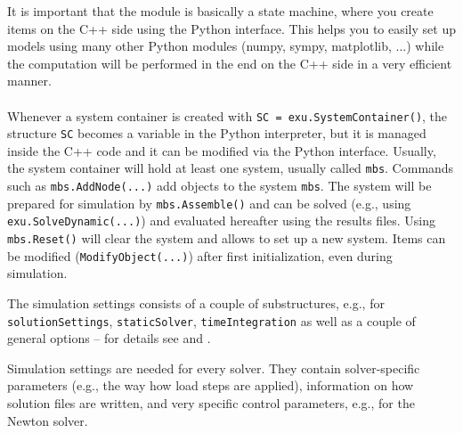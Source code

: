 It is important that the \codeName module is basically a state machine, where you create items on the C++ side using the Python interface. This helps you to easily set up models using many other Python modules (numpy, sympy, matplotlib, ...) while the computation will be performed in the end on the C++ side in a very efficient manner. 
\vspace{12pt}\\
\vspace{6pt}\\
Whenever a system container is created with \texttt{SC = exu.SystemContainer()}, the structure \texttt{SC} becomes a variable in the Python interpreter, but it is managed inside the C++ code and it can be modified via the Python interface.
Usually, the system container will hold at least one system, usually called \texttt{mbs}.
Commands such as \texttt{mbs.AddNode(...)} add objects to the system \texttt{mbs}. 
The system will be prepared for simulation by \texttt{mbs.Assemble()} and can be solved (e.g., using \texttt{exu.SolveDynamic(...)}) and evaluated hereafter using the results files.
Using \texttt{mbs.Reset()} will clear the system and allows to set up a new system. Items can be modified (\texttt{ModifyObject(...)}) after first initialization, even during simulation.
%

The simulation settings consists of a couple of substructures, e.g., for \texttt{solutionSettings}, \texttt{staticSolver}, \texttt{timeIntegration} as well as a couple of general options -- for details see  and .

Simulation settings are needed for every solver. They contain solver-specific parameters (e.g., the way how load steps are applied), information on how solution files are written, and very specific control parameters, e.g., for the Newton solver. 

